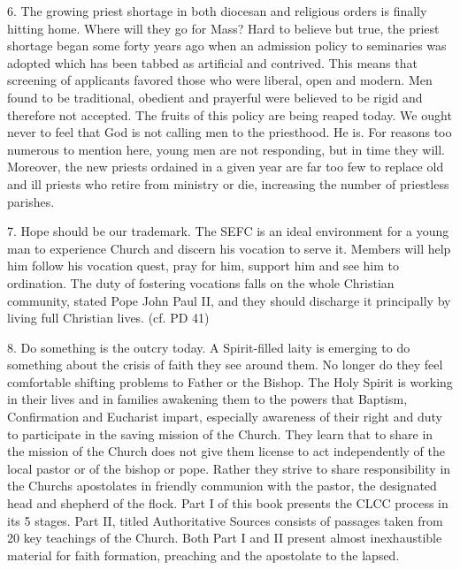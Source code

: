 \documentclass[oneside]{book}
\begin{document}
6. The growing priest shortage in both diocesan and religious orders is finally
hitting home. Where will they go for Mass? Hard to believe but true, the priest
shortage began some forty years ago when an admission policy to seminaries was
adopted which has been tabbed as artificial and contrived. This means that
screening of applicants favored those who were liberal, open and modern. Men
found to be traditional, obedient and prayerful were believed to be rigid and
therefore not accepted. The fruits of this policy are being reaped today. We
ought never to feel that God is not calling men to the priesthood. He is. For
reasons too numerous to mention here, young men are not responding, but in time
they will. Moreover, the new priests ordained in a given year are far too few to
replace old and ill priests who retire from ministry or die, increasing the
number of priestless parishes.

7. Hope should be our trademark. The SEFC is an ideal environment for a young
man to experience Church and discern his vocation to serve it. Members will help
him follow his vocation quest, pray for him, support him and see him to
ordination. The duty of fostering vocations falls on the whole Christian
community, stated Pope John Paul II, and they should discharge it principally by
living full Christian lives. (cf. PD 41)

8. Do something is the outcry today. A Spirit-filled laity is emerging to do
something about the crisis of faith they see around them. No longer do they feel
comfortable shifting problems to Father or the Bishop. The Holy Spirit is
working in their lives and in families awakening them to the powers that
Baptism, Confirmation and Eucharist impart, especially awareness of their right
and duty to participate in the saving mission of the Church. They learn that to
share in the mission of the Church does not give them license to act
independently of the local pastor or of the bishop or pope. Rather they strive
to share responsibility in the Churchs apostolates in friendly communion with
the pastor, the designated head and shepherd of the flock.  Part I of this book
presents the CLCC process in its 5 stages. Part II, titled Authoritative Sources
consists of passages taken from 20 key teachings of the Church. Both Part I and
II present almost inexhaustible material for faith formation, preaching and the
apostolate to the lapsed.

\end{document}
